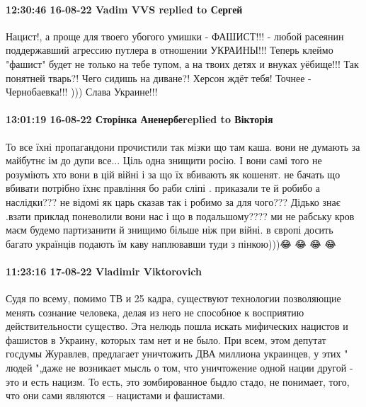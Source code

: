  
 
 
 
 

\paragraph{12:30:46 16-08-22 Vadim VVS replied to Сергей}

Нацист!, а проще для твоего убогого умишки - ФАШИСТ!!! - любой расеянин
поддержавший агрессию путлера в отношении УКРАИНЫ!!! Теперь клеймо "фашист"
будет не только на тебе тупом, а на твоих детях и внуках уёбище!!! Так понятней
тварь?! Чего сидишь на диване?! Херсон ждёт тебя! Точнее - Чернобаевка!!! )))
Слава Украине!!!

\paragraph{13:01:19 16-08-22 Сторінка Аненербеreplied to Вікторія}

То все їхні пропагандони прочистили так мізки що там каша. вони не думають за
майбутнє ім до дупи все... Ціль одна знищити росію. І вони самі того не
розуміють хто вони в цій війні і за що їх вбивають як кошенят. не бачать що
вбивати потрібно їхнє правління бо раби сліпі . приказали те й робибо а
наслідки??? не відомі як царь сказав так і робимо за для чого??? Дідько знає
.взати приклад поневолили вони нас і що в подальшому???? ми не рабську кров
маєм будемо партизанити й знищимо більше ніж при війні. в європі досить багато
українців подають їм каву наплювавши туди з пінкою)))😂 😂 😂 😂

\paragraph{11:23:16 17-08-22 Vladimir Viktorovich}

Судя по всему, помимо ТВ и 25 кадра, существуют технологии позволяющие менять сознание человека, делая из него не способное к восприятию действительности существо. Эта нелюдь пошла искать мифических нацистов и
фашистов в Украину, которых там нет и не было.                         При всем, этом депутат госдумы Журавлев,  предлагает уничтожить ДВА миллиона украинцев, у этих " людей ",даже не возникает мысль о том, что уничтожение одной нации другой - это и есть нацизм. То есть, это зомбированное быдло стадо, не понимает, того, что они сами являются – нацистами и фашистами.

